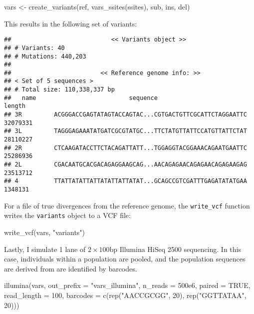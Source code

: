 \documentclass[12pt,]{article}
\newenvironment{Shaded}{}{}
\newcommand{\DataTypeTok}[1]{#1}
\newcommand{\DecValTok}[1]{#1}
\newcommand{\FloatTok}[1]{#1}
\newcommand{\KeywordTok}[1]{\textcolor[rgb]{0.00,0.00,1.00}{#1}}
\newcommand{\NormalTok}[1]{#1}
\newcommand{\OtherTok}[1]{\textcolor[rgb]{1.00,0.25,0.00}{#1}}
\newcommand{\StringTok}[1]{\textcolor[rgb]{0.00,0.50,0.50}{#1}}
\begin{document}
\begin{Shaded}
\begin{Highlighting}[]
\NormalTok{vars <-}\StringTok{ }\KeywordTok{create_variants}\NormalTok{(ref, }\KeywordTok{vars_ssites}\NormalTok{(ssites), sub, ins, del)}
\end{Highlighting}
\end{Shaded}

This results in the following set of variants:

\begin{verbatim}
##                            << Variants object >>
## # Variants: 40
## # Mutations: 440,203
## 
##                         << Reference genome info: >>
## < Set of 5 sequences >
## # Total size: 110,338,337 bp
##   name                          sequence                             length
## 3R         ACGGGACCGAGTATAGTACCAGTAC...CGTGACTGTTCGCATTCTAGGAATTC  32079331
## 3L         TAGGGAGAAATATGATCGCGTATGC...TTCTATGTTATTCCATGTTATTCTAT  28110227
## 2R         CTCAAGATACCTTCTACAGATTATT...TGGAGGTACGGAAACAGAATGAATTC  25286936
## 2L         CGACAATGCACGACAGAGGAAGCAG...AACAGAGAACAGAGAACAGAGAAGAG  23513712
## 4          TTATTATATTATTATATTATTATAT...GCAGCCGTCGATTTGAGATATATGAA   1348131
\end{verbatim}

For a file of true divergences from the reference genome, the \texttt{write\_vcf} function
writes the \texttt{variants} object to a VCF file:

\begin{Shaded}
\begin{Highlighting}[]
\KeywordTok{write_vcf}\NormalTok{(vars, }\StringTok{"variants"}\NormalTok{)}
\end{Highlighting}
\end{Shaded}

Lastly, I simulate 1 lane of \(2 \times 100\)bp Illumina HiSeq 2500 sequencing.
In this case, individuals within a population are pooled, and the population
sequences are derived from are identified by barcodes.

\begin{Shaded}
\begin{Highlighting}[]
\KeywordTok{illumina}\NormalTok{(vars, }\DataTypeTok{out_prefix =} \StringTok{"vars_illumina"}\NormalTok{, }\DataTypeTok{n_reads =} \FloatTok{500e6}\NormalTok{, }\DataTypeTok{paired =} \OtherTok{TRUE}\NormalTok{,}
         \DataTypeTok{read_length =} \DecValTok{100}\NormalTok{, }\DataTypeTok{barcodes =} \KeywordTok{c}\NormalTok{(}\KeywordTok{rep}\NormalTok{(}\StringTok{"AACCGCGG"}\NormalTok{, }\DecValTok{20}\NormalTok{), }
                                         \KeywordTok{rep}\NormalTok{(}\StringTok{"GGTTATAA"}\NormalTok{, }\DecValTok{20}\NormalTok{)))}
\end{Highlighting}
\end{Shaded}
\end{document}
